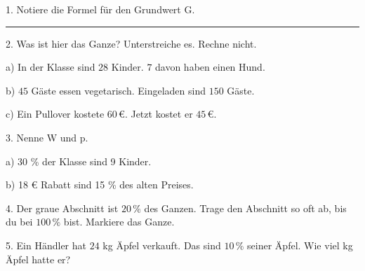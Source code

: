 \documentclass[11pt]{article}
\let\gkopf\empty
\newcommand{\gueber}[1]{\gdef\gkopf{#1}}
\newlength{\gEin}\setlength{\gEin}{0pt}
\newcommand{\gzwei}[2]{\par\smallskip\noindent\sbox{\gbox}{#1}%
  \setlength{\gLinks}{\dimexpr0.5\textwidth-\gEin-\mbpfnr\relax}%
  \ifdim\wd\gbox>\dimexpr\gLinks-4mm\relax
    \usebox{\gbox}\par\smallskip\noindent\begin{minipage}{\linewidth}#2\end{minipage}%
  \else
    \begin{minipage}[c]{\gLinks}\usebox{\gbox}\end{minipage}%
    \begin{minipage}[c]{\dimexpr\linewidth-\gLinks\relax}\raggedright #2\end{minipage}%
  \fi\par}
\begin{document}
\pfheftstil
\fancyfoot[C]{\parbox[t]{\textwidth}{\mbfhbox\par\vspace{1.5mm}{\footnotesize\color{mbgrau}{\scriptsize Z8W}\hfill\thepage}}}
\begin{pfaufg}{}{1.}{}
Notiere die Formel für den Grundwert G.\hfill{\color{black!45}\rule[-1pt]{0.45\linewidth}{0.4pt}}
\end{pfaufg}
\begin{pfaufg}{}{2.}{}
Was ist hier das Ganze? Unterstreiche es. Rechne nicht.\par\smallskip\noindent a) In der Klasse sind $28$ Kinder. $7$ davon haben einen Hund.\par\noindent b) $45$ Gäste essen vegetarisch. Eingeladen sind $150$ Gäste.\par\noindent c) Ein Pullover kostete $60\,€$. Jetzt kostet er $45\,€$.
\end{pfaufg}
\begin{pfaufg}{}{3.}{}
Nenne W und p.\par\smallskip\noindent a) 30 \% der Klasse sind 9 Kinder.\par\vspace{6mm}\noindent{\color{black!45}\rule{\linewidth}{0.4pt}}\par\smallskip\noindent b) 18 € Rabatt sind 15 \% des alten Preises.\par\vspace{6mm}\noindent{\color{black!45}\rule{\linewidth}{0.4pt}}
\end{pfaufg}
\par\addvspace{6pt}\gueber{\vspace{10pt}{\large\bfseries Vom Teil zum Ganzen}\par\vspace{2pt}}
\begin{pfaufg}{}{4.}{}
Der graue Abschnitt ist $20\,\%$ des Ganzen. Trage den Abschnitt so oft ab, bis du bei $100\,\%$ bist. Markiere das Ganze.
\gzwei{\streifen[0]{20}{$0\,\%$}{}}{\par\noindent \leerfeld[Abschnitte] \par}
\end{pfaufg}
\begin{pfaufg}{}{5.}{}
Ein Händler hat $24$ kg Äpfel verkauft. Das sind $10\,\%$ seiner Äpfel. Wie viel kg Äpfel hatte er?
\par\noindent \leerfeld[kg] \par
{}
\end{pfaufg}
\end{document}
